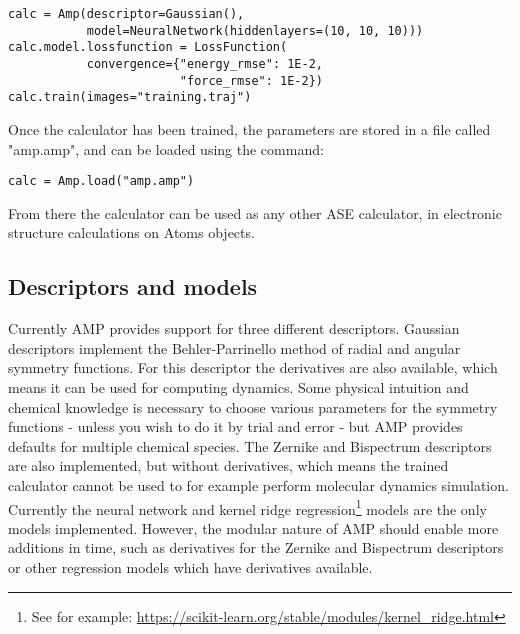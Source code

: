\begin{verbatim}
calc = Amp(descriptor=Gaussian(),
           model=NeuralNetwork(hiddenlayers=(10, 10, 10)))
calc.model.lossfunction = LossFunction(
           convergence={"energy_rmse": 1E-2,
                        "force_rmse": 1E-2})
calc.train(images="training.traj")
\end{verbatim}

Once the calculator has been trained, the parameters
are stored in a file called "amp.amp",
and can be loaded using the command:

\begin{verbatim}
calc = Amp.load("amp.amp")
\end{verbatim}

From there the calculator can be used as any other ASE calculator,
in electronic structure calculations on Atoms objects.

\subsection{Descriptors and models}
Currently AMP provides support for three different descriptors.
Gaussian descriptors implement the Behler-Parrinello method
of radial and angular symmetry functions. For this descriptor
the derivatives are also available, which means it can be used
for computing dynamics. Some physical intuition and chemical knowledge
is necessary to choose various parameters for the symmetry functions -
unless you wish to do it by trial and error - but AMP provides
defaults for multiple chemical species.
The Zernike and Bispectrum descriptors are also implemented,
but without derivatives, which means the trained calculator
cannot be used to for example perform molecular dynamics simulation.
Currently the neural network and kernel ridge regression\footnote{
    See for example: \url{
        https://scikit-learn.org/stable/modules/kernel_ridge.html}}
models are the only models implemented.
However, the modular nature of AMP should enable more additions
in time, such as derivatives for the Zernike and Bispectrum descriptors
or other regression models which have derivatives available.
